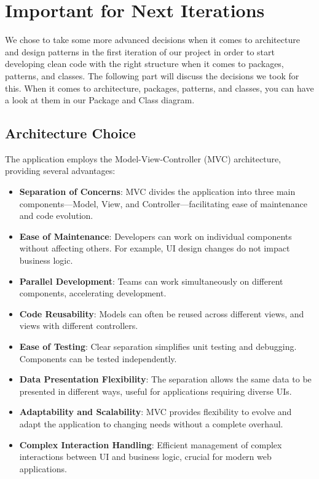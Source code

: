 \documentclass{article}
\begin{document}
\section{Important for Next Iterations}

We chose to take some more advanced decisions when it comes to architecture and design patterns in the first iteration of our project in order to start developing clean code with the right structure when it comes to packages, patterns, and classes. The following part will discuss the decisions we took for this. When it comes to architecture, packages, patterns, and classes, you can have a look at them in our Package and Class diagram.

\subsection{Architecture Choice}

The application employs the Model-View-Controller (MVC) architecture, providing several advantages:

\begin{itemize}
    \item \textbf{Separation of Concerns}: MVC divides the application into three main components—Model, View, and Controller—facilitating ease of maintenance and code evolution.
    \item \textbf{Ease of Maintenance}: Developers can work on individual components without affecting others. For example, UI design changes do not impact business logic.
    \item \textbf{Parallel Development}: Teams can work simultaneously on different components, accelerating development.
    \item \textbf{Code Reusability}: Models can often be reused across different views, and views with different controllers.
    \item \textbf{Ease of Testing}: Clear separation simplifies unit testing and debugging. Components can be tested independently.
    \item \textbf{Data Presentation Flexibility}: The separation allows the same data to be presented in different ways, useful for applications requiring diverse UIs.
    \item \textbf{Adaptability and Scalability}: MVC provides flexibility to evolve and adapt the application to changing needs without a complete overhaul.
    \item \textbf{Complex Interaction Handling}: Efficient management of complex interactions between UI and business logic, crucial for modern web applications.
\end{itemize}
\end{document}

